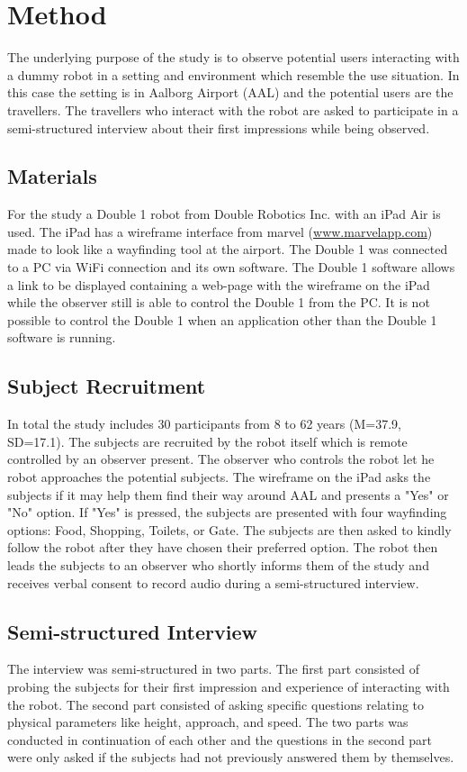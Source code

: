 \section{Method}
\label{Method}
The underlying purpose of the study is to observe potential users interacting with a dummy robot in a setting and environment which resemble the use situation. In this case the setting is in Aalborg Airport (AAL) and the potential users are the travellers. The travellers who interact with the robot are asked to participate in a semi-structured interview about their first impressions while being observed. 

\subsection{Materials}
For the study a Double 1 robot from Double Robotics Inc. with an iPad Air is used. The iPad has a wireframe interface from marvel (\url{www.marvelapp.com}) made to look like a wayfinding tool at the airport. The Double 1 was connected to a PC via WiFi connection and its own software. The Double 1 software allows a link to be displayed containing a web-page with the wireframe on the iPad while the observer still is able to control the Double 1 from the PC. It is not possible to control the Double 1 when an application other than the Double 1 software is running.

\subsection{Subject Recruitment}
In total the study includes 30 participants from 8 to 62 years (M=37.9, SD=17.1). The subjects are recruited by the robot itself which is remote controlled by an observer present. The observer who controls the robot let he robot approaches the potential subjects. The wireframe on the iPad asks the subjects if it may help them find their way around AAL and presents a "Yes" or "No" option. If "Yes" is pressed, the subjects are presented with four wayfinding options: Food, Shopping, Toilets, or Gate. The subjects are then asked to kindly follow the robot after they have chosen their preferred option. The robot then leads the subjects to an observer who shortly informs them of the study and receives verbal consent to record audio during a semi-structured interview.
 
 \subsection{Semi-structured Interview}
 The interview was semi-structured in two parts. The first part consisted of probing the subjects for their first impression and experience of interacting with the robot. The second part consisted of asking specific questions relating to physical parameters like height, approach, and speed. The two parts was conducted in continuation of each other and the questions in the second part were only asked if the subjects had not previously answered them by themselves.
 
